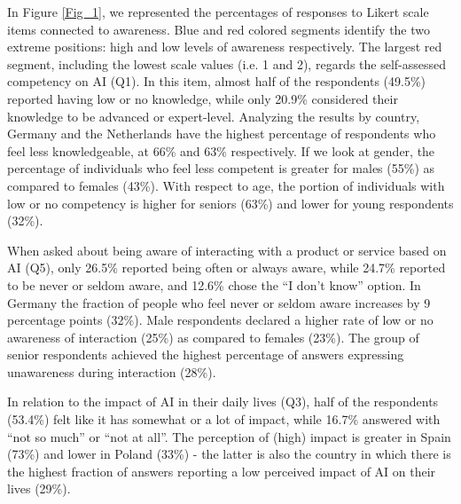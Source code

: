 \documentclass{article}
\begin{document}
In Figure \ref{Fig_1}, we represented the percentages of responses to Likert scale items connected to awareness. Blue and red colored segments identify the two extreme positions: high and low levels of awareness respectively. 
The largest red segment, including the lowest scale values (i.e. 1 and 2), regards the self-assessed competency on AI (Q1). In this item, almost half of the respondents (49.5\%) reported having low or no knowledge, while only 20.9\% considered their knowledge to be advanced or expert-level.%
Analyzing the results by country, Germany and the Netherlands have the highest percentage of respondents who feel less knowledgeable, at 66\% and 63\% respectively. If we look at gender, the percentage of individuals who feel less competent is greater for males (55\%) as compared to females (43\%). With respect to age, the portion of individuals with low or no competency is higher for seniors (63\%) and lower for young respondents (32\%).

When asked about being aware of interacting with a product or service based on AI (Q5), only 26.5\% reported being often or always aware, while 24.7\% reported to be never or seldom aware, and 12.6\% chose the ``I don't know'' option. In Germany the fraction of people who feel never or seldom aware increases by 9 percentage points (32\%). Male respondents declared a higher rate of low or no awareness of interaction (25\%) as compared to females (23\%). The group of senior respondents achieved the highest percentage of answers expressing unawareness during interaction (28\%). 

In relation to the impact of AI in their daily lives (Q3), half of the respondents (53.4\%) felt like it has somewhat or a lot of impact,%
while 16.7\% answered with ``not so much'' or ``not at all''. The perception of (high) impact is greater in Spain (73\%) and lower in Poland (33\%) - the latter is also the country in which there is the highest fraction of answers reporting a low perceived impact of AI on their lives (29\%).
\end{document}
